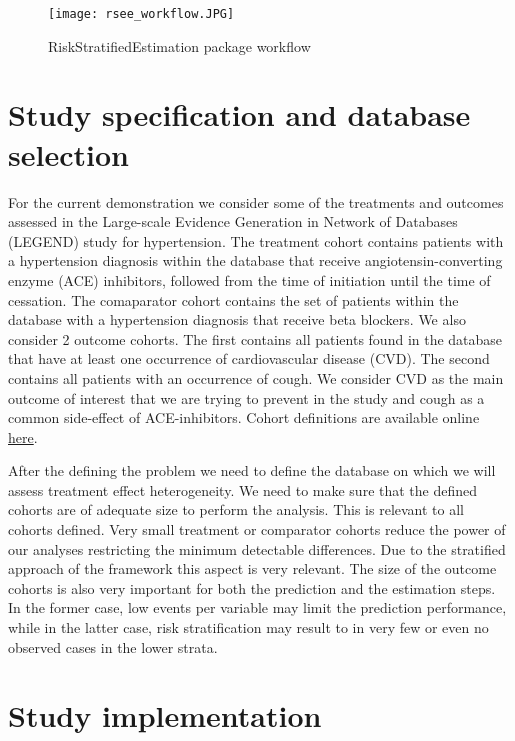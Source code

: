 \documentclass[]{article}
\begin{document}
\begin{figure}
\centering
\texttt{[image: rsee\_workflow.JPG]}
\caption{RiskStratifiedEstimation package workflow \label{workflow}}
\end{figure}

\hypertarget{study-specification-and-database-selection}{%
\section{Study specification and database
selection}\label{study-specification-and-database-selection}}

For the current demonstration we consider some of the treatments and
outcomes assessed in the Large-scale Evidence Generation in Network of
Databases (LEGEND) study for hypertension. The treatment cohort contains
patients with a hypertension diagnosis within the database that receive
angiotensin-converting enzyme (ACE) inhibitors, followed from the time
of initiation until the time of cessation. The comaparator cohort
contains the set of patients within the database with a hypertension
diagnosis that receive beta blockers. We also consider 2 outcome
cohorts. The first contains all patients found in the database that have
at least one occurrence of cardiovascular disease (CVD). The second
contains all patients with an occurrence of cough. We consider CVD as
the main outcome of interest that we are trying to prevent in the study
and cough as a common side-effect of ACE-inhibitors. Cohort definitions
are available online \href{https://github.com/OHDSI/Legend}{here}.

After the defining the problem we need to define the database on which
we will assess treatment effect heterogeneity. We need to make sure that
the defined cohorts are of adequate size to perform the analysis. This
is relevant to all cohorts defined. Very small treatment or comparator
cohorts reduce the power of our analyses restricting the minimum
detectable differences. Due to the stratified approach of the framework
this aspect is very relevant. The size of the outcome cohorts is also
very important for both the prediction and the estimation steps. In the
former case, low events per variable may limit the prediction
performance, while in the latter case, risk stratification may result to
in very few or even no observed cases in the lower strata.

\hypertarget{study-implementation}{%
\section{Study implementation}\label{study-implementation}}
\end{document}

